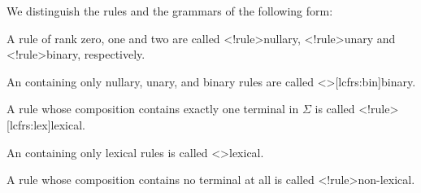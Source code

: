 \documentclass[../../document.tex]{subfiles}
\begin{document}
    \begin{definition}We distinguish the rules and the grammars of the following form:
        \begin{compactitem}
            \item A rule of rank zero, one and two are called <\lcfrs!rule>{nullary}, <\lcfrs!rule>{unary} and <\lcfrs!rule>{binary}, respectively.
            \item An  containing only nullary, unary, and binary rules are called <\lcfrs>[lcfrs:bin]{binary}.
            \item A rule whose composition contains exactly one terminal in \(\varSigma\) is called <\lcfrs!rule>[lcfrs:lex]{lexical}.
            \item An  containing only lexical rules is called <\lcfrs>{lexical}.
            \item A rule whose composition contains no terminal at all is called <\lcfrs!rule>{non-lexical}.
        \end{compactitem}
    \end{definition}
\end{document}
